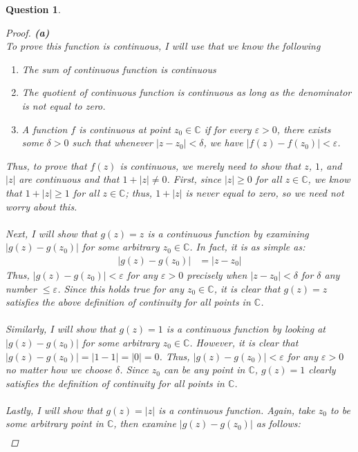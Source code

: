 \documentclass[10pt,a4paper]{article}
\newtheorem*{question*}{Question}
\begin{document}
\begin{question*}{$ $}
\begin{proof}{\textbf{(a)}}
\\To prove this function is continuous, I will use that we know the following
\begin{enumerate}
\item The sum of continuous function is continuous
\item The quotient of continuous function is continuous as long as the denominator is not equal to zero. 
\item A function $f$ is continuous at point $z_0 \in \mathbb{C}$ if for every $\varepsilon > 0$, there exists some $\delta > 0$ such that whenever $|z - z_0| < \delta$, we have $|f(z) - f(z_0)| < \varepsilon$.
\end{enumerate}
Thus, to prove that $f(z)$ is continuous, we merely need to show that $z$, $1$, and $|z|$ are continuous and that $1 + |z| \neq 0$. First, since $|z| \geq 0$ for all $z \in \mathbb{C}$, we know that $1 + |z| \geq 1$ for all $z \in \mathbb{C}$; thus, $1 + |z|$ is never equal to zero, so we need not worry about this.\\
\\Next, I will show that $g(z) = z$ is a continuous function by examining $|g(z) - g(z_0)|$ for some arbitrary $z_0 \in \mathbb{C}$. In fact, it is as simple as:
\begin{align*}
|g(z) - g(z_0)| &= |z - z_0|
\end{align*}
Thus, $|g(z) - g(z_0)| < \varepsilon$ for any $\varepsilon > 0$ precisely when $|z - z_0| < \delta$ for $\delta$ any number $ \leq \varepsilon$. Since this holds true for any $z_0 \in \mathbb{C}$, it is clear that $g(z) = z$ satisfies the above definition of continuity for all points in $\mathbb{C}$.\\
\\Similarly, I will show that $g(z) = 1$ is a continuous function by looking at $|g(z) - g(z_0)|$ for some arbitrary $z_0 \in \mathbb{C}$. However, it is clear that $|g(z) - g(z_0)| = |1 - 1| = |0| = 0$. Thus, $|g(z) - g(z_0)| < \varepsilon$ for any $\varepsilon > 0$ no matter how we choose $\delta$. Since $z_0$ can be any point in $\mathbb{C}$, $g(z) = 1$ clearly satisfies the definition of continuity for all points in $\mathbb{C}$.\\
\\Lastly, I will show that $g(z) = |z|$ is a continuous function. Again, take $z_0$ to be some arbitrary point in $\mathbb{C}$, then examine $|g(z) - g(z_0)|$ as follows:
\begin{align*}

\end{align*}
\end{proof}
\end{question*}
\end{document}
